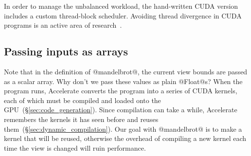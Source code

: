 In order to manage the unbalanced workload, the hand-written CUDA version
includes a custom thread-block scheduler. Avoiding thread divergence in CUDA
programs is an active area of research~\cite{Zhang:2010jc}.

%
%
%

\subsection{Passing inputs as arrays}

Note that in the definition of @mandelbrot@, the current view bounds are passed
as a scalar array. Why don't we pass these values as plain @Float@s? When the
program runs, Accelerate converts the program into a series of CUDA kernels,
each of which must be compiled and loaded onto the
GPU~(\S\ref{sec:code_generation}). Since compilation can take a while,
Accelerate remembers the kernels it has seen before and reuses
them~(\S\ref{sec:dynamic_compilation}). Our goal with @mandelbrot@ is to make a
kernel that will be reused, otherwise the overhead of compiling a new kernel
each time the view is changed will ruin performance.

